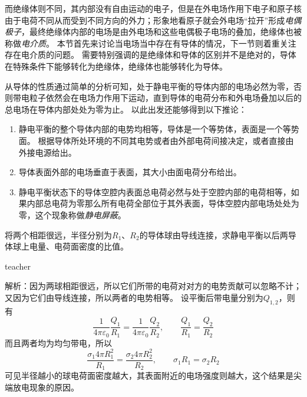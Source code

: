 而绝缘体则不同，其内部没有自由运动的电子，但是在外电场作用下电子和原子核由于电荷不同从而受到不同方向的外力；形象地看原子就会外电场“拉开”形成\emph{电偶极子}，最终绝缘体内部的电场是由外电场和这些电偶极子电场的叠加，绝缘体也被称做\emph{电介质}。
本节首先来讨论当电场当中存在有导体的情况，下一节则着重关注存在电介质的问题。
需要特别强调的是绝缘体和导体的区别并不是绝对的，导体在特殊条件下能够转化为绝缘体，绝缘体也能够转化为导体。

从导体的性质通过简单的分析可知，处于静电平衡的导体内部的电场必然为零，否则带电粒子依然会在电场力作用下运动，直到导体的电荷分布和外电场叠加以后的总电场在导体内部处处为零为止。
以此出发还能够得到以下推论：
\begin{enumerate}
\item 静电平衡的整个导体内部的电势均相等，导体是一个等势体，表面是一个等势面。
根据导体所处环境的不同其电势或者由外部电荷间接决定，或者直接由外接电源给出。
\item 
导体表面外部的电场垂直于表面，其大小由面电荷分布给出。
\item 静电平衡状态下的导体空腔内表面总电荷必然与处于空腔内部的电荷相等，如果内部总电荷为零那么所有电荷全部位于其外表面，导体空腔内部电场处处为零，这个现象称做\emph{静电屏蔽}。
\end{enumerate}


\begin{example}
将两个相距很远，半径分别为$R_1$、$R_2$的导体球由导线连接，求静电平衡以后两导体球上电量、电荷面密度的比值。
\begin{taggedblock}{teacher}

解析：因为两球相距很远，所以它们所带的电荷对对方的电势贡献可以忽略不计；又因为它们由导线连接，所以两者的电势相等。
设平衡后带电量分别为$Q_{1,2}$，则有
\[
\frac{1}{4\pi \varepsilon_0}\frac{Q_1}{R_1} = \frac{1}{4\pi \varepsilon_0}\frac{Q_2}{R_2},\qquad  \frac{Q_1}{R_1} = \frac{Q_2}{R_2}
\]
而且两者均为均匀带电，所以
\[
\frac{ \sigma_1 4 \pi R_1^2}{R_1} = \frac{ \sigma_2 4 \pi R_2^2}{R_2},\qquad \sigma_1R_1 = \sigma_2R_2 
\]
可见半径越小的球电荷面密度越大，其表面附近的电场强度则越大，这个结果是尖端放电现象的原因。
\end{taggedblock}
\end{example}

